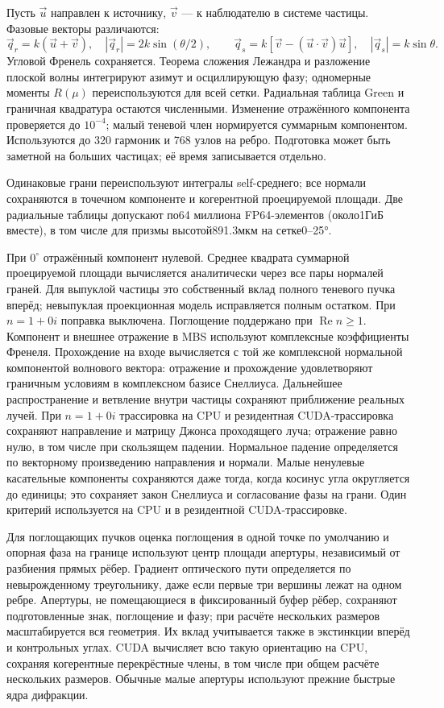 \documentclass[11pt,a4paper]{article}
\begin{document}
Пусть $\vec u$ направлен к источнику, $\vec v$ --- к наблюдателю в системе
частицы. Фазовые векторы различаются:
\[
 \vec q_r=k(\vec u+\vec v),\quad |\vec q_r|=2k\sin(\theta/2),
 \qquad \vec q_s=k[\vec v-(\vec u\cdot\vec v)\vec u],\quad |\vec q_s|=k\sin\theta.
\]
Угловой Френель сохраняется. Теорема сложения Лежандра и разложение плоской
волны интегрируют азимут и осциллирующую фазу; одномерные моменты $R(\mu)$
переиспользуются для всей сетки. Радиальная таблица Green и граничная
квадратура остаются численными. Изменение отражённого компонента проверяется
до $10^{-4}$; малый теневой член нормируется суммарным компонентом.
Используются до 320 гармоник и 768 узлов на ребро. Подготовка может быть
заметной на больших частицах; её время записывается отдельно.

Одинаковые грани переиспользуют интегралы self-среднего; все нормали
сохраняются в точечном компоненте и когерентной проецируемой площади.
Две радиальные таблицы допускают по64 миллиона FP64-элементов
(около1ГиБ вместе), в том числе для призмы высотой891.3мкм на сетке0--25°.

При $0^\circ$ отражённый компонент нулевой. Среднее квадрата суммарной
проецируемой площади вычисляется аналитически через все пары нормалей граней.
Для выпуклой частицы это собственный вклад полного теневого пучка вперёд;
невыпуклая проекционная модель исправляется полным остатком. При $n=1+0i$
поправка выключена. Поглощение поддержано при $\operatorname{Re}n\geq1$.
Компонент и внешнее отражение в MBS используют комплексные коэффициенты Френеля.
Прохождение на входе вычисляется с той же комплексной нормальной компонентой
волнового вектора: отражение и прохождение удовлетворяют граничным условиям
в комплексном базисе Снеллиуса. Дальнейшее распространение и ветвление внутри
частицы сохраняют приближение реальных лучей.
При $n=1+0i$ трассировка на CPU и резидентная CUDA-трассировка сохраняют направление
и матрицу Джонса проходящего луча; отражение равно нулю, в том числе при скользящем падении.
Нормальное падение определяется по векторному произведению направления и нормали.
Малые ненулевые касательные компоненты сохраняются даже тогда, когда косинус
угла округляется до единицы; это сохраняет закон Снеллиуса и согласование фазы
на грани. Один критерий используется на CPU и в резидентной CUDA-трассировке.

Для поглощающих пучков оценка поглощения в одной точке по умолчанию и опорная
фаза на границе используют центр площади апертуры, независимый от разбиения
прямых рёбер. Градиент оптического пути определяется по невырожденному
треугольнику, даже если первые три вершины лежат на одном ребре. Апертуры,
не помещающиеся в фиксированный буфер рёбер, сохраняют подготовленные знак,
поглощение и фазу; при расчёте нескольких размеров масштабируется вся геометрия.
Их вклад учитывается также в экстинкции вперёд и контрольных углах. CUDA
вычисляет всю такую ориентацию на CPU, сохраняя когерентные перекрёстные члены,
в том числе при общем расчёте нескольких размеров. Обычные малые апертуры
используют прежние быстрые ядра дифракции.
\end{document}
